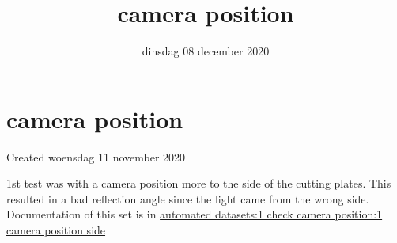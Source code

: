 \documentclass{scrartcl}
\title{camera position}
\date{dinsdag 08 december 2020}
\author{}
\begin{document}
\maketitle

		\section{camera position}

Created woensdag 11 november 2020



1st test was with a camera position more to the side of the cutting plates. This resulted in a bad reflection angle since the light came from the wrong side. Documentation of this set is in \href{./automated_datasets/1_check_camera_position/1_camera_position_side.tex}{automated datasets:1 check camera position:1 camera position side} 
\end{document}
